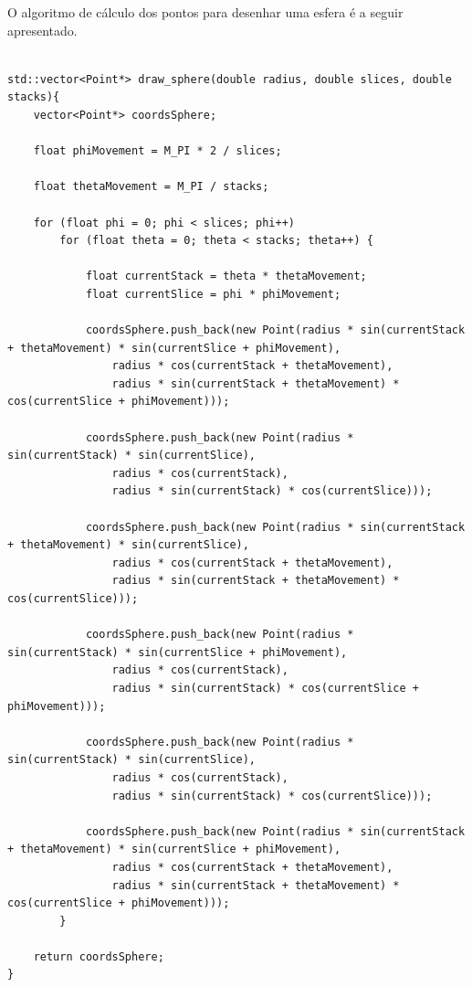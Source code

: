 \documentclass[a4paper]{article}
\begin{document}
O algoritmo de cálculo dos pontos para desenhar uma esfera é a seguir apresentado.\\
\\
\begin{lstlisting}
std::vector<Point*> draw_sphere(double radius, double slices, double stacks){
    vector<Point*> coordsSphere;

    float phiMovement = M_PI * 2 / slices;

    float thetaMovement = M_PI / stacks;

    for (float phi = 0; phi < slices; phi++)
        for (float theta = 0; theta < stacks; theta++) {

            float currentStack = theta * thetaMovement;
            float currentSlice = phi * phiMovement;

            coordsSphere.push_back(new Point(radius * sin(currentStack + thetaMovement) * sin(currentSlice + phiMovement),
                radius * cos(currentStack + thetaMovement),
                radius * sin(currentStack + thetaMovement) * cos(currentSlice + phiMovement)));

            coordsSphere.push_back(new Point(radius * sin(currentStack) * sin(currentSlice),
                radius * cos(currentStack),
                radius * sin(currentStack) * cos(currentSlice)));

            coordsSphere.push_back(new Point(radius * sin(currentStack + thetaMovement) * sin(currentSlice),
                radius * cos(currentStack + thetaMovement),
                radius * sin(currentStack + thetaMovement) * cos(currentSlice)));

            coordsSphere.push_back(new Point(radius * sin(currentStack) * sin(currentSlice + phiMovement),
                radius * cos(currentStack),
                radius * sin(currentStack) * cos(currentSlice + phiMovement)));

            coordsSphere.push_back(new Point(radius * sin(currentStack) * sin(currentSlice),
                radius * cos(currentStack),
                radius * sin(currentStack) * cos(currentSlice)));

            coordsSphere.push_back(new Point(radius * sin(currentStack + thetaMovement) * sin(currentSlice + phiMovement),
                radius * cos(currentStack + thetaMovement),
                radius * sin(currentStack + thetaMovement) * cos(currentSlice + phiMovement)));
        }

    return coordsSphere;
}

\end{lstlisting}
\end{document}

